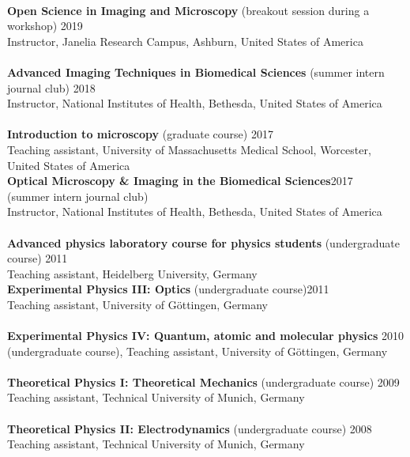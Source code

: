 \documentclass[margin,line]{res}
\begin{document}
\begin{resume}
\vspace*{-3mm}\\
{\bf  Open Science in Imaging and Microscopy} (breakout session during a workshop)  \hfill 2019\\
Instructor, Janelia Research Campus, Ashburn, United States of America\\
\vspace*{-3mm}\\
{\bf Advanced Imaging Techniques in Biomedical Sciences} (summer intern journal club) \hfill {2018}\\
Instructor, National Institutes of Health, Bethesda, United States of America \\
\vspace*{-3mm}\\
{\bf Introduction to microscopy} (graduate course) \hfill {2017}\\
Teaching assistant, University of Massachusetts Medical School, Worcester, \\
United States of America\\
{\bf Optical Microscopy \& Imaging in the Biomedical Sciences}\hfill {2017}\\
 (summer intern journal club) \\
 Instructor, National Institutes of Health, Bethesda, United States of America \\
\vspace*{-3mm}\\
{\bf Advanced physics laboratory course for physics students} (undergraduate course) \hfill {2011}\\
Teaching assistant, Heidelberg University, Germany\\
{\bf Experimental Physics III: Optics}  (undergraduate course)\hfill {2011}\\
Teaching assistant, University of Göttingen, Germany \\
\vspace*{-3mm}\\
{\bf Experimental Physics IV: Quantum, atomic and molecular physics}  \hfill {2010}\\
(undergraduate course), Teaching assistant, University of Göttingen, Germany\\
\vspace*{-3mm}\\
{\bf Theoretical Physics I: Theoretical Mechanics} (undergraduate course) \hfill {2009}\\
Teaching assistant, Technical University of Munich, Germany\\
\vspace*{-3mm}\\
{\bf Theoretical Physics II: Electrodynamics} (undergraduate course) \hfill {2008}\\
Teaching assistant, Technical University of Munich, Germany\\



\end{resume}
\end{document}
